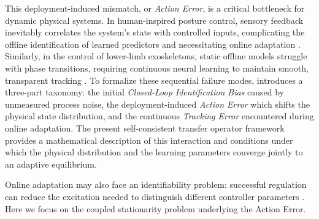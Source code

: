 \documentclass[11pt]{article}
\theoremstyle{definition}
\theoremstyle{remark}
\begin{document}
This deployment-induced mismatch, or \emph{Action Error}, is a critical bottleneck for dynamic physical systems. In human-inspired posture control, sensory feedback inevitably correlates the system's state with controlled inputs,  complicating the offline identification of learned predictors and necessitating online adaptation \cite{lippi2018prediction}. Similarly, in the control of lower-limb exoskeletons, static offline models struggle with phase transitions, requiring continuous neural learning to maintain smooth, transparent tracking \cite{lippi2021icinco}. 
To formalize these sequential failure modes, \cite{LippiActionError} introduces a three-part taxonomy: the initial \emph{Closed-Loop Identification Bias} caused by unmeasured process noise, the deployment-induced \emph{Action Error} which shifts the physical state distribution, and the continuous \emph{Tracking Error} encountered during online adaptation. 
The present self-consistent transfer operator framework
provides a mathematical description of this interaction
and conditions under which the physical distribution and
the learning parameters converge jointly to an adaptive
equilibrium.


Online adaptation may also face an identifiability problem:
successful regulation can reduce the excitation needed
to distinguish different controller parameters
\cite{LippiActionError,Annaswamy2023}.
Here we focus on the coupled stationarity problem underlying the  Action Error.



\end{document}
